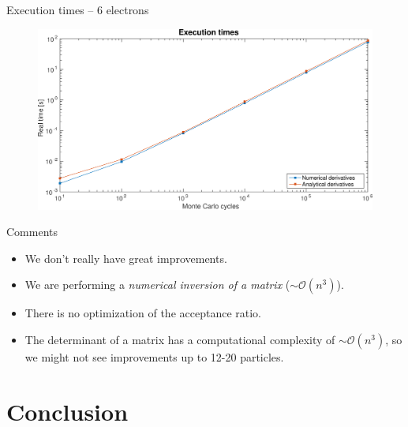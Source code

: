 \documentclass[10pt, compress, usetitleprogressbar, protectframetitle, handout]{beamer}
\begin{document}
\begin{versionLONG}
\begin{frame}{Execution times -- 6 electrons}
	\begin{figure}
		\includegraphics[width=\textwidth]{times_6e}
	\end{figure}
	

\end{frame}

\begin{frame}{Comments}

	\begin{itemize}[<+->]
		\item We don't really have great improvements.
		\item We are performing a \emph{numerical inversion of a matrix} ($\sim\mathcal{O}(n^3)$).
		\item There is no optimization of the acceptance ratio.
		\item The determinant of a matrix has a computational complexity of $\sim\mathcal{O}(n^3)$, so we might not see improvements up to 12-20 particles.
	\end{itemize}

\end{frame}

\end{versionLONG}

\section{Conclusion}
\end{document}
